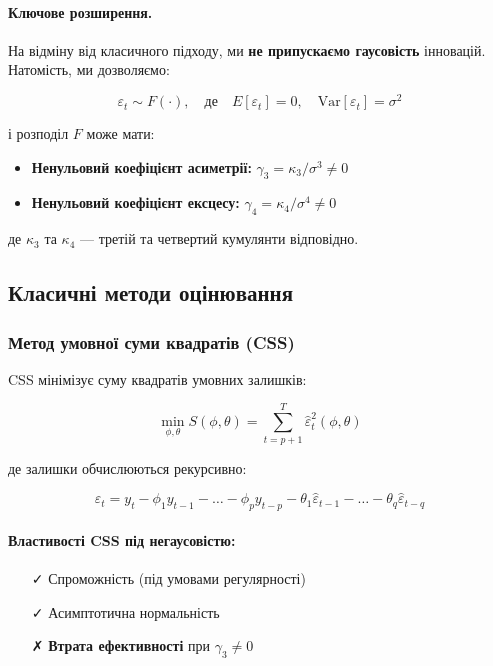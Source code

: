 \paragraph{Ключове розширення.}

На відміну від класичного підходу, ми \textbf{не припускаємо гаусовість} інновацій. Натомість, ми дозволяємо:

\begin{equation}
\label{eq:non_gaussian}
\varepsilon_t \sim F(\cdot), \quad \text{де} \quad E[\varepsilon_t] = 0, \quad \text{Var}[\varepsilon_t] = \sigma^2
\end{equation}

\noindent і розподіл $F$ може мати:
\begin{itemize}
    \item \textbf{Ненульовий коефіцієнт асиметрії:} $\gamma_3 = \kappa_3/\sigma^3 \neq 0$
    \item \textbf{Ненульовий коефіцієнт ексцесу:} $\gamma_4 = \kappa_4/\sigma^4 \neq 0$
\end{itemize}

\noindent де $\kappa_3$ та $\kappa_4$ --- третій та четвертий кумулянти відповідно.

\subsection{Класичні методи оцінювання}
\label{subsec:classical_methods}

\subsubsection{Метод умовної суми квадратів (CSS)}
\label{subsubsec:css}

CSS мінімізує суму квадратів умовних залишків:

\begin{equation}
\label{eq:css_objective}
\min_{\phi,\theta} S(\phi,\theta) = \sum_{t=p+1}^{T} \hat{\varepsilon}_t^2(\phi,\theta)
\end{equation}

\noindent де залишки обчислюються рекурсивно:

\begin{equation}
\label{eq:css_residuals}
\hat{\varepsilon}_t = y_t - \phi_1 y_{t-1} - \ldots - \phi_p y_{t-p} - \theta_1 \hat{\varepsilon}_{t-1} - \ldots - \theta_q \hat{\varepsilon}_{t-q}
\end{equation}

\paragraph{Властивості CSS під негаусовістю:}
\begin{itemize}
    \item[✓] Спроможність (під умовами регулярності)
    \item[✓] Асимптотична нормальність
    \item[✗] \textbf{Втрата ефективності} при $\gamma_3 \neq 0$
\end{itemize}

